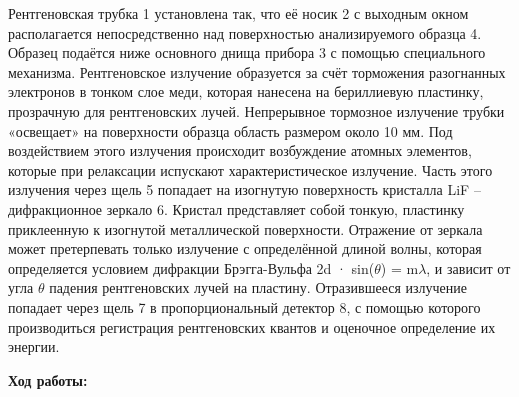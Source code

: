 \documentclass[a4paper, 12pt]{article}%
\begin{document}
	Рентгеновская трубка 1
	установлена так, что её носик 2 с выходным окном располагается непосредственно над поверхностью анализируемого образца 4. Образец подаётся ниже основного днища прибора 3 с помощью специального механизма. Рентгеновское излучение образуется за счёт торможения разогнанных электронов в тонком слое меди, которая нанесена на бериллиевую пластинку, прозрачную для рентгеновских лучей. Непрерывное
	тормозное излучение трубки «освещает» на поверхности образца область размером около 10 мм. Под воздействием этого излучения происходит возбуждение атомных элементов, которые при релаксации испускают характеристическое излучение. Часть этого излучения через щель 5 попадает на изогнутую поверхность кристалла LiF – дифракционное
	зеркало 6. Кристал представляет собой тонкую, пластинку приклеенную
	к изогнутой металлической поверхности. Отражение от зеркала может
	претерпевать только излучение с определённой длиной волны, которая
	определяется условием дифракции Брэгга-Вульфа 2d · sin($\theta$) = m$\lambda$, и зависит от угла $\theta$
	падения рентгеновских лучей на пластину. Отразившееся излучение попадает через щель 7 в пропорциональный детектор 8, с помощью которого производиться регистрация рентгеновских квантов и оценочное
	определение их энергии.
	
	
	\newpage
	
	\textbf{Ход работы: }\\
	
\end{document}
